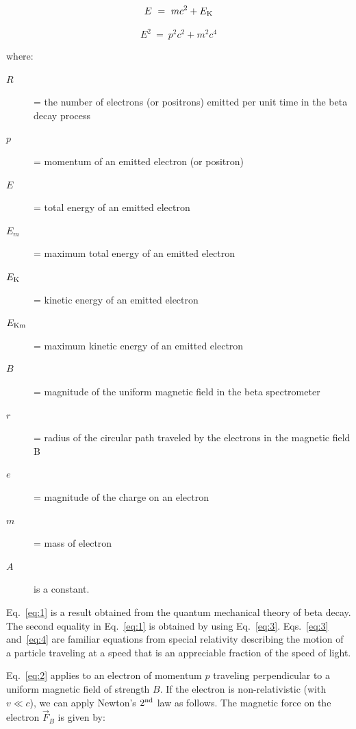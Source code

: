 \documentclass{article}
\begin{document}
\begin{equation}
E~=~mc^2 + E_{\rm K}
\label{eq:3}
\end{equation}

\begin{equation}
E^2~=~p^2c^2 + m^2c^4
\label{eq:4}
\end{equation}

where:

\begin{description}
\item[$R$] = the number of electrons (or positrons) emitted per unit time in the beta decay process

\item[$p$] = momentum of an emitted electron (or positron)

\item[$E$] = total energy of an emitted electron

\item[$E_{m}$] = maximum total energy of an emitted electron

\item[$E_{\rm K}$] = kinetic energy of an emitted electron

\item[$E_{\rm Km}$] = maximum kinetic energy of an emitted electron

\item[$B$] = magnitude of the uniform magnetic field in the beta spectrometer

\item[$r$] = radius of the circular path traveled by the electrons in the magnetic field B

\item[$e$] = magnitude of the charge on an electron

\item[$m$] = mass of electron

\item[$A$] is a constant.
\end{description}

Eq.~\ref{eq:1} is a result obtained from the quantum mechanical theory of beta
decay.  The second equality in Eq.~\ref{eq:1} is obtained by using Eq.~\ref{eq:3}.
Eqs.~\ref{eq:3} and~\ref{eq:4} are familiar equations from special relativity
describing the motion of a particle traveling at a speed that is an
appreciable fraction of the speed of light.

Eq.~\ref{eq:2} applies to an electron of momentum $p$ traveling
perpendicular to a uniform magnetic field of strength $B$.  If the
electron is non-relativistic (with $v \ll c$), we can
apply Newton's $2^{\rm nd}$
law as follows.  The magnetic force on the electron
$\vec{F}_B$ is
given by:
\end{document}
